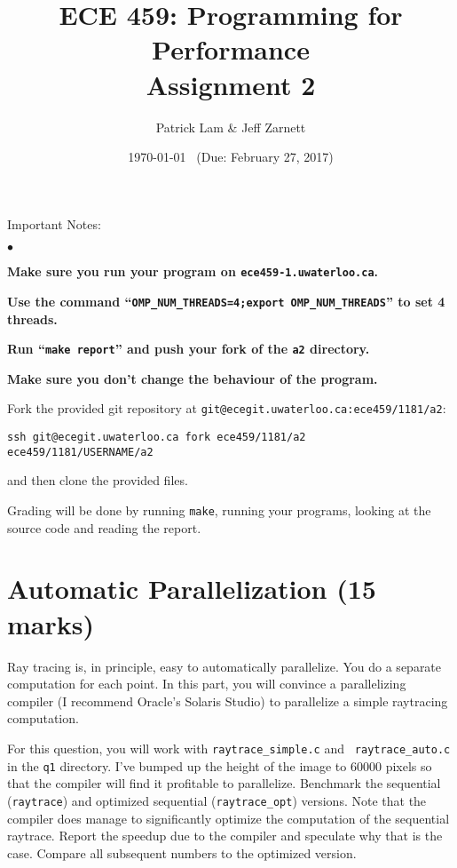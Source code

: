 \documentclass[letterpaper,10pt]{article}
\title{\bf ECE 459: Programming for Performance\\Assignment 2}
\author{Patrick Lam \& Jeff Zarnett}
\date{\today ~ (Due: February 27, 2017)}
\begin{document}
\maketitle
\newcommand{\squishlist}{
 \begin{list}{$\bullet$}
  { \setlength{\itemsep}{0pt}
     \setlength{\parsep}{3pt}
     \setlength{\topsep}{3pt}
     \setlength{\partopsep}{0pt}
     \setlength{\leftmargin}{1.5em}
     \setlength{\labelwidth}{1em}
     \setlength{\labelsep}{0.5em} } }
\newcommand{\squishend}{
  \end{list}  }

\noindent
Important Notes:

\squishlist
  \item {\bf Make sure you run your program on {\tt ece459-1.uwaterloo.ca}.}
  \item {\bf Use the command ``{\tt OMP\_NUM\_THREADS=4;export OMP\_NUM\_THREADS}'' to set 4 threads.}
  \item {\bf Run ``{\tt make report}'' and push your fork of the {\tt a2} directory.}
  \item {\bf Make sure you don't change the behaviour of the program.}
\squishend

\noindent
Fork the provided git repository at {\tt git@ecegit.uwaterloo.ca:ece459/1181/a2}:
\begin{center}
{\tt ssh git@ecegit.uwaterloo.ca fork ece459/1181/a2 ece459/1181/USERNAME/a2}
\end{center}
\noindent and then clone the provided files.

Grading will be done by running {\tt make}, running your programs,
looking at the source code and reading the report.

\section{Automatic Parallelization (15 marks)}
Ray tracing is, in principle, easy to automatically parallelize. You do
a separate computation for each point. In this part, you will convince a
parallelizing compiler (I recommend Oracle's Solaris Studio) to parallelize
a simple raytracing computation.

For this question, you will work with {\tt raytrace\_simple.c} and {\tt
  raytrace\_auto.c} in the {\tt q1} directory.  I've bumped up the
height of the image to 60000 pixels so that the compiler will find it
profitable to parallelize. Benchmark the sequential ({\tt raytrace})
and optimized sequential ({\tt raytrace\_opt}) versions. Note that the
compiler does manage to significantly optimize the computation of the sequential
raytrace. Report the speedup due to the compiler and
speculate why that is the case. Compare all subsequent numbers
to the optimized version.
\end{document}
